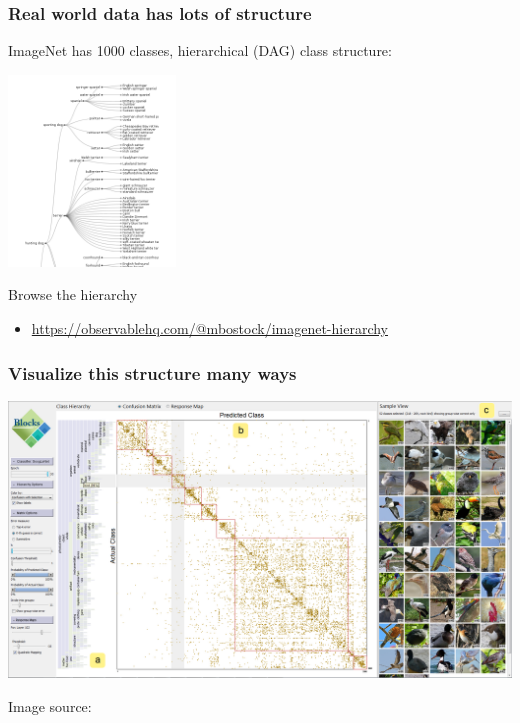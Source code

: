 \begin{frame}
\frametitle{Real world data has lots of structure}

ImageNet has 1000 classes, hierarchical (DAG) class structure:

\includegraphics[height=2in]{img/imagent-hierarchy}

\vspace{0.25in}
Browse the hierarchy
\begin{itemize}
\item
\url{https://observablehq.com/@mbostock/imagenet-hierarchy}
\end{itemize}

\end{frame}


\begin{frame}
\frametitle{Visualize this structure many ways}

\includegraphics[width=\textwidth]{img/teaser}

{\tiny Image source: \citet{bilal2018}}
\end{frame}

